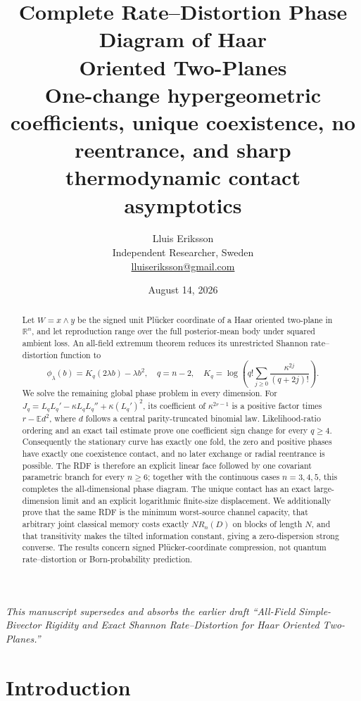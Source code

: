 \documentclass[11pt,a4paper]{article}
\title{\textbf{Complete Rate--Distortion Phase Diagram of Haar\\
Oriented Two-Planes}\\[2mm]
\large One-change hypergeometric coefficients, unique coexistence, no
reentrance, and sharp thermodynamic contact asymptotics}
\author{Lluis Eriksson\\[-1mm]
\small Independent Researcher, Sweden\\
\small \href{mailto:lluiseriksson@gmail.com}{lluiseriksson@gmail.com}}
\date{August 14, 2026}
\newcommand{\R}{\mathbb R}
\begin{document}
\maketitle
\vspace{-1.2em}
\begin{center}
\small\emph{This manuscript supersedes and absorbs the earlier draft
``All-Field Simple-Bivector Rigidity and Exact Shannon Rate--Distortion for
Haar Oriented Two-Planes.''}
\end{center}
\vspace{0.4em}

\begin{abstract}
Let $W=x\wedge y$ be the signed unit Pl\"ucker coordinate of a Haar oriented
two-plane in $\R^n$, and let reproduction range over the full posterior-mean
body under squared ambient loss.  An all-field extremum theorem reduces its
unrestricted Shannon rate--distortion function to
\[
 \phi_\lambda(b)=K_q(2\lambda b)-\lambda b^2,
 \quad q=n-2,
 \quad K_q=\log\!\left(q!\sum_{j\ge0}
 \frac{\kappa^{2j}}{(q+2j)!}\right).
\]
We solve the remaining global phase problem in every dimension.  For
$J_q=L_qL_q'-\kappa L_qL_q''+\kappa(L_q')^2$, its coefficient of
$\kappa^{2r-1}$ is a positive factor times
$r-\mathbb E d^2$, where $d$ follows a central parity-truncated binomial law.
Likelihood-ratio ordering and an exact tail estimate prove one coefficient
sign change for every $q\ge4$.  Consequently the stationary curve has exactly
one fold, the zero and positive phases have exactly one coexistence contact,
and no later exchange or radial reentrance is possible.  The RDF is therefore
an explicit linear face followed by one covariant parametric branch for every
$n\ge6$; together with the continuous cases $n=3,4,5$, this completes the
all-dimensional phase diagram.  The unique contact has an exact
large-dimension limit and an explicit logarithmic finite-size displacement.
We additionally prove that the same RDF is
the minimum worst-source channel capacity, that arbitrary joint classical
memory costs exactly $N R_n(D)$ on blocks of length $N$, and that transitivity
makes the tilted information constant, giving a zero-dispersion strong
converse.  The results concern signed Pl\"ucker-coordinate compression, not
quantum rate--distortion or Born-probability prediction.
\end{abstract}

\section{Introduction}
\end{document}
